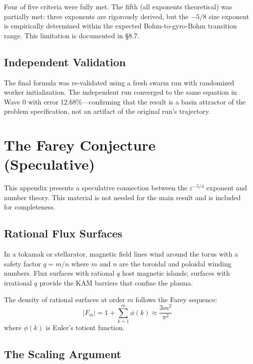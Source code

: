 \documentclass[11pt,letterpaper]{article}
\begin{document}
Four of five criteria were fully met. The fifth (all exponents theoretical) was partially met: three exponents are rigorously derived, but the $-5/8$ size exponent is empirically determined within the expected Bohm-to-gyro-Bohm transition range. This limitation is documented in \S8.7.

\subsection{Independent Validation}

The final formula was re-validated using a fresh swarm run with randomized worker initialization. The independent run converged to the same equation in Wave 0 with error 12.68\%---confirming that the result is a basin attractor of the problem specification, not an artifact of the original run's trajectory.

\section{The Farey Conjecture (Speculative)}

This appendix presents a speculative connection between the $\varepsilon^{-5/4}$ exponent and number theory. This material is not needed for the main result and is included for completeness.

\subsection{Rational Flux Surfaces}

In a tokamak or stellarator, magnetic field lines wind around the torus with a safety factor $q = m/n$ where $m$ and $n$ are the toroidal and poloidal winding numbers. Flux surfaces with rational $q$ host magnetic islands; surfaces with irrational $q$ provide the KAM barriers that confine the plasma.

The density of rational surfaces at order $m$ follows the Farey sequence:
\begin{equation}
|F_m| = 1 + \sum_{k=1}^{m} \phi(k) \approx \frac{3m^2}{\pi^2}
\end{equation}
where $\phi(k)$ is Euler's totient function.

\subsection{The Scaling Argument}
\end{document}
